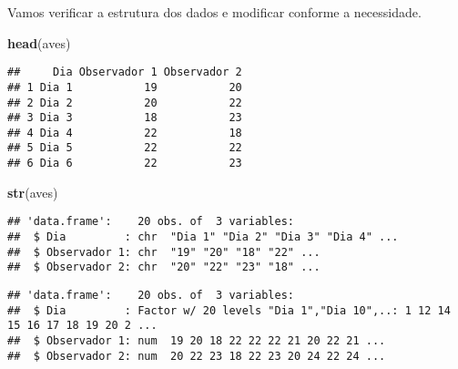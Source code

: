 \documentclass[titlepage, oneside, openany, a4paper]{book}
\newenvironment{Shaded}{\begin{snugshade}}{\end{snugshade}}
\newcommand{\DataTypeTok}[1]{\textcolor[rgb]{0.13,0.29,0.53}{#1}}
\newcommand{\KeywordTok}[1]{\textcolor[rgb]{0.13,0.29,0.53}{\textbf{#1}}}
\newcommand{\NormalTok}[1]{#1}
\newcommand{\OperatorTok}[1]{\textcolor[rgb]{0.81,0.36,0.00}{\textbf{#1}}}
\newcommand{\StringTok}[1]{\textcolor[rgb]{0.31,0.60,0.02}{#1}}
\begin{document}
Vamos verificar a estrutura dos dados e modificar conforme a necessidade.

\begin{Shaded}
\begin{Highlighting}[]
\KeywordTok{head}\NormalTok{(aves)}
\end{Highlighting}
\end{Shaded}

\begin{verbatim}
##     Dia Observador 1 Observador 2
## 1 Dia 1           19           20
## 2 Dia 2           20           22
## 3 Dia 3           18           23
## 4 Dia 4           22           18
## 5 Dia 5           22           22
## 6 Dia 6           22           23
\end{verbatim}

\begin{Shaded}
\begin{Highlighting}[]
\KeywordTok{str}\NormalTok{(aves)}
\end{Highlighting}
\end{Shaded}

\begin{verbatim}
## 'data.frame':    20 obs. of  3 variables:
##  $ Dia         : chr  "Dia 1" "Dia 2" "Dia 3" "Dia 4" ...
##  $ Observador 1: chr  "19" "20" "18" "22" ...
##  $ Observador 2: chr  "20" "22" "23" "18" ...
\end{verbatim}

\begin{Shaded}
\end{Shaded}

\begin{verbatim}
## 'data.frame':    20 obs. of  3 variables:
##  $ Dia         : Factor w/ 20 levels "Dia 1","Dia 10",..: 1 12 14 15 16 17 18 19 20 2 ...
##  $ Observador 1: num  19 20 18 22 22 22 21 20 22 21 ...
##  $ Observador 2: num  20 22 23 18 22 23 20 24 22 24 ...
\end{verbatim}
\end{document}
